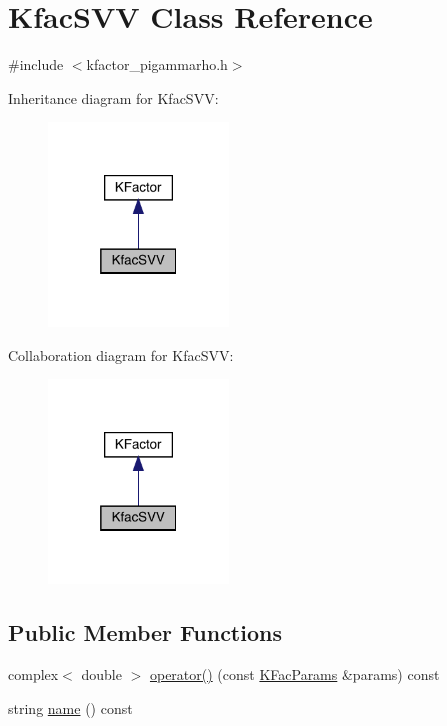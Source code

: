 \hypertarget{classKfacSVV}{}\section{Kfac\+S\+VV Class Reference}
\label{classKfacSVV}


{\ttfamily \#include $<$kfactor\+\_\+pigammarho.\+h$>$}



Inheritance diagram for Kfac\+S\+VV\+:\nopagebreak
\begin{figure}[H]
\begin{center}
\leavevmode
\includegraphics[width=136pt]{d9/d5e/classKfacSVV__inherit__graph}
\end{center}
\end{figure}


Collaboration diagram for Kfac\+S\+VV\+:\nopagebreak
\begin{figure}[H]
\begin{center}
\leavevmode
\includegraphics[width=136pt]{d5/d86/classKfacSVV__coll__graph}
\end{center}
\end{figure}
\subsection*{Public Member Functions}
\begin{DoxyCompactItemize}
\item 
complex$<$ double $>$ \mbox{\hyperlink{classKfacSVV_abc4b565ae1fbf1109bbed4b05b3d5ee7}{operator()}} (const \mbox{\hyperlink{classKFacParams}{K\+Fac\+Params}} \&params) const
\item 
string \mbox{\hyperlink{classKfacSVV_ad7ab40ec924a678cd785a9743e676d6c}{name}} () const
\end{DoxyCompactItemize}


